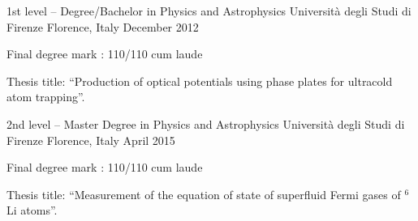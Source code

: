\begin{cventries}
  \cventry
    {1st level – Degree/Bachelor in Physics and Astrophysics}
    {Università degli Studi di Firenze}
    {Florence, Italy}
    {December 2012}
    {
      \begin{cvitems}
        \item {Final degree mark : 110/110 cum laude}
        \item{Thesis title: “Production of optical potentials using phase plates for ultracold atom trapping”.}
      \end{cvitems}
    }
    
  \cventry
    {2nd level – Master Degree in Physics and Astrophysics}
    {Università degli Studi di Firenze}
    {Florence, Italy}
    {April 2015}
    {
      \begin{cvitems}
      \item {Final degree mark : 110/110 cum laude}
      \item {Thesis title: “Measurement of the equation of state of superfluid Fermi gases of $^6$Li atoms”.}
      \end{cvitems}
    }
\end{cventries}
